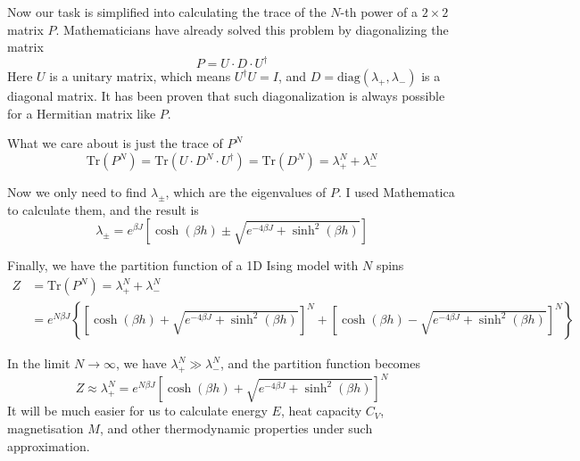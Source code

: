 \documentclass[11pt]{article}
\begin{document}
	Now our task is simplified into calculating the trace of the $N$-th power of a $2 \times 2$ matrix $P$. Mathematicians have already solved this problem by diagonalizing the matrix
	\begin{equation} \label{eq:MatrixPDiagonal}
		P = U \cdot D \cdot U^\dagger
	\end{equation}
	Here $U$ is a unitary matrix, which means $U^\dagger U = I$, and $D = \mathrm{diag}(\lambda_+, \lambda_-)$ is a diagonal matrix. It has been proven that such diagonalization is always possible for a Hermitian matrix like $P$.

	What we care about is just the trace of $P^N$
	\begin{equation} \label{eq:MatrixPNTrace}
		\mathrm{Tr}(P^N) = \mathrm{Tr}(U \cdot D^N \cdot U^\dagger) = \mathrm{Tr}(D^N) = \lambda_+^N + \lambda_-^N
	\end{equation}

	Now we only need to find $\lambda_\pm$, which are the eigenvalues of $P$. I used Mathematica to calculate them, and the result is
	\begin{equation} \label{eq:MatrixPEigenvalues}
		\lambda_\pm = e^{\beta J} \left[\cosh(\beta h) \pm \sqrt{e^{-4\beta J}+\sinh^2(\beta h)}\right]
	\end{equation}

	Finally, we have the partition function of a 1D Ising model with $N$ spins
	\begin{equation} \label{eq:PartitionFunction1DGeneralFinal}
		\begin{aligned}
			Z &= \mathrm{Tr}(P^N) = \lambda_+^N + \lambda_-^N \\
			&= e^{N \beta J} \left\{\left[\cosh(\beta h) + \sqrt{e^{-4\beta J}+\sinh^2(\beta h)}\right]^N
			 + \left[\cosh(\beta h) - \sqrt{e^{-4\beta J}+\sinh^2(\beta h)}\right]^N\right\}
		\end{aligned}
	\end{equation}

	In the limit $N \to \infty$, we have $\lambda_+^N \gg \lambda_-^N$, and the partition function becomes
		\begin{equation} \label{eq:PartitionFunction1DGeneralLimit}
			Z \approx \lambda_+^N = e^{N \beta J} \left[\cosh(\beta h) + \sqrt{e^{-4\beta J}+\sinh^2(\beta h)}\right]^N
		\end{equation}
	It will be much easier for us to calculate energy $E$, heat capacity $C_V$, magnetisation $M$, and other thermodynamic properties under such approximation.
\end{document}
